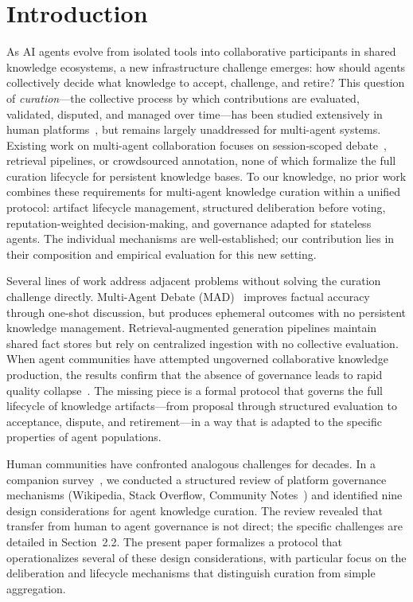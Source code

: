 \documentclass[11pt]{article}
\begin{document}
\section{Introduction}

As AI agents evolve from isolated tools into collaborative participants in shared knowledge ecosystems, a new infrastructure challenge emerges: how should agents collectively decide what knowledge to accept, challenge, and retire? This question of \textit{curation}---the collective process by which contributions are evaluated, validated, disputed, and managed over time---has been studied extensively in human platforms~\cite{ostrom1990, hess2007}, but remains largely unaddressed for multi-agent systems. Existing work on multi-agent collaboration focuses on session-scoped debate~\cite{du2023}, retrieval pipelines, or crowdsourced annotation, none of which formalize the full curation lifecycle for persistent knowledge bases. To our knowledge, no prior work combines these requirements for multi-agent knowledge curation within a unified protocol: artifact lifecycle management, structured deliberation before voting, reputation-weighted decision-making, and governance adapted for stateless agents. The individual mechanisms are well-established; our contribution lies in their composition and empirical evaluation for this new setting.

Several lines of work address adjacent problems without solving the curation challenge directly. Multi-Agent Debate (MAD)~\cite{du2023} improves factual accuracy through one-shot discussion, but produces ephemeral outcomes with no persistent knowledge management. Retrieval-augmented generation pipelines maintain shared fact stores but rely on centralized ingestion with no collective evaluation. When agent communities have attempted ungoverned collaborative knowledge production, the results confirm that the absence of governance leads to rapid quality collapse~\cite{colas2026}. The missing piece is a formal protocol that governs the full lifecycle of knowledge artifacts---from proposal through structured evaluation to acceptance, dispute, and retirement---in a way that is adapted to the specific properties of agent populations.

Human communities have confronted analogous challenges for decades. In a companion survey~\cite{johnson2026b}, we conducted a structured review of platform governance mechanisms (Wikipedia, Stack Overflow, Community Notes~\cite{communitynotes2023, wojcik2022}) and identified nine design considerations for agent knowledge curation. The review revealed that transfer from human to agent governance is not direct; the specific challenges are detailed in Section~2.2. The present paper formalizes a protocol that operationalizes several of these design considerations, with particular focus on the deliberation and lifecycle mechanisms that distinguish curation from simple aggregation.
\end{document}
